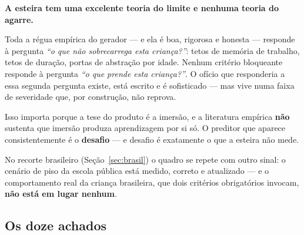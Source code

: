 \documentclass[11pt,a4paper]{article}
\begin{document}
\begin{tesebox}
\textbf{A esteira tem uma excelente teoria do limite e nenhuma teoria do agarre.}

Toda a r\'egua emp\'irica do gerador --- e ela \'e boa, rigorosa e honesta --- responde \`a
pergunta \emph{``o que n\~ao sobrecarrega esta crian\c{c}a?''}: tetos de mem\'oria de trabalho,
tetos de dura\c{c}\~ao, portas de abstra\c{c}\~ao por idade. Nenhum crit\'erio bloqueante responde
\`a pergunta \emph{``o que prende esta crian\c{c}a?''}. O of\'icio que responderia a essa segunda
pergunta existe, est\'a escrito e \'e sofisticado --- mas vive numa faixa de severidade que, por
constru\c{c}\~ao, n\~ao reprova.

Isso importa porque a tese do produto \'e a imers\~ao, e a literatura emp\'irica \textbf{n\~ao}
sustenta que imers\~ao produza aprendizagem por si s\'o. O preditor que aparece consistentemente
\'e o \textbf{desafio} --- e desafio \'e exatamente o que a esteira n\~ao mede.

No recorte brasileiro (Se\c{c}\~ao~\ref{sec:brasil}) o quadro se repete com outro sinal: o
cen\'ario de piso da escola p\'ublica est\'a medido, correto e atualizado --- e o comportamento
real da crian\c{c}a brasileira, que dois crit\'erios obrigat\'orios invocam, \textbf{n\~ao est\'a
em lugar nenhum}.
\end{tesebox}

\subsection{Os doze achados}
\end{document}
